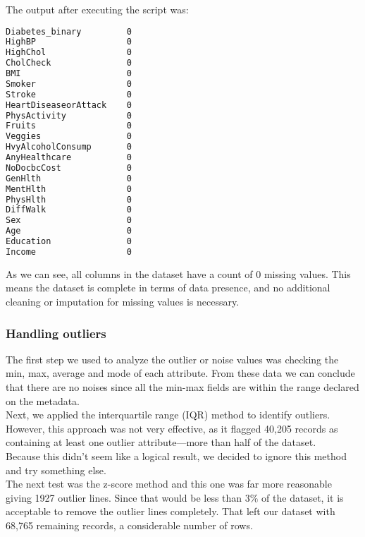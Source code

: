 

The output after executing the script was:

\begin{lstlisting}[language=bash]
Diabetes_binary         0
HighBP                  0
HighChol                0
CholCheck               0
BMI                     0
Smoker                  0
Stroke                  0
HeartDiseaseorAttack    0
PhysActivity            0
Fruits                  0
Veggies                 0
HvyAlcoholConsump       0
AnyHealthcare           0
NoDocbcCost             0
GenHlth                 0
MentHlth                0
PhysHlth                0
DiffWalk                0
Sex                     0
Age                     0
Education               0
Income                  0
\end{lstlisting}

As we can see, all columns in the dataset have a count of 0 missing values. This means the dataset is complete in terms of data presence, and no additional cleaning or imputation for missing values is necessary.

\subsubsection{Handling outliers}

The first step we used to analyze the outlier or noise values was checking the min, max, average and mode of each attribute. From these data we can conclude that there are no noises since all the min-max fields are within the range declared on the metadata.\\

\noindent Next, we applied the interquartile range (IQR) method to identify outliers. However, this approach was not very effective, as it flagged 40,205 records as containing at least one outlier attribute—more than half of the dataset.\\
Because this didn’t seem like a logical result, we decided to ignore this method and try something else.\\

\noindent The next test was the z-score method and this one was far more reasonable giving 1927 outlier lines. Since that would be less than 3$\%$ of the dataset, it is acceptable to remove the outlier lines completely. That left our dataset with 68,765 remaining records, a considerable number of rows.\\

